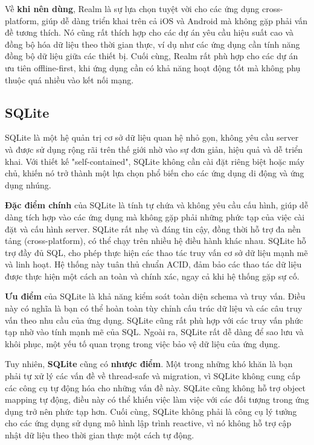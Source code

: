 Về \textbf{khi nên dùng}, Realm là sự lựa chọn tuyệt vời cho các ứng dụng cross-platform, giúp dễ dàng triển khai trên cả iOS và Android mà không gặp phải vấn đề tương thích. Nó cũng rất thích hợp cho các dự án yêu cầu hiệu suất cao và đồng bộ hóa dữ liệu theo thời gian thực, ví dụ như các ứng dụng cần tính năng đồng bộ dữ liệu giữa các thiết bị. Cuối cùng, Realm rất phù hợp cho các dự án ưu tiên offline-first, khi ứng dụng cần có khả năng hoạt động tốt mà không phụ thuộc quá nhiều vào kết nối mạng.

\subsection{SQLite}
SQLite là một hệ quản trị cơ sở dữ liệu quan hệ nhỏ gọn, không yêu cầu server và được sử dụng rộng rãi trên thế giới nhờ vào sự đơn giản, hiệu quả và dễ triển khai. Với thiết kế "self-contained", SQLite không cần cài đặt riêng biệt hoặc máy chủ, khiến nó trở thành một lựa chọn phổ biến cho các ứng dụng di động và ứng dụng nhúng.

\textbf{Đặc điểm chính} của SQLite là tính tự chứa và không yêu cầu cấu hình, giúp dễ dàng tích hợp vào các ứng dụng mà không gặp phải những phức tạp của việc cài đặt và cấu hình server. SQLite rất nhẹ và đáng tin cậy, đồng thời hỗ trợ đa nền tảng (cross-platform), có thể chạy trên nhiều hệ điều hành khác nhau. SQLite hỗ trợ đầy đủ SQL, cho phép thực hiện các thao tác truy vấn cơ sở dữ liệu mạnh mẽ và linh hoạt. Hệ thống này tuân thủ chuẩn ACID, đảm bảo các thao tác dữ liệu được thực hiện một cách an toàn và chính xác, ngay cả khi hệ thống gặp sự cố.

\textbf{Ưu điểm} của SQLite là khả năng kiểm soát toàn diện schema và truy vấn. Điều này có nghĩa là bạn có thể hoàn toàn tùy chỉnh cấu trúc dữ liệu và các câu truy vấn theo nhu cầu của ứng dụng. SQLite cũng rất phù hợp với các truy vấn phức tạp nhờ vào tính mạnh mẽ của SQL. Ngoài ra, SQLite rất dễ dàng để sao lưu và khôi phục, một yếu tố quan trọng trong việc bảo vệ dữ liệu của ứng dụng.

Tuy nhiên, \textbf{SQLite} cũng có \textbf{nhược điểm}. Một trong những khó khăn là bạn phải tự xử lý các vấn đề về thread-safe và migration, vì SQLite không cung cấp các công cụ tự động hóa cho những vấn đề này. SQLite cũng không hỗ trợ object mapping tự động, điều này có thể khiến việc làm việc với các đối tượng trong ứng dụng trở nên phức tạp hơn. Cuối cùng, SQLite không phải là công cụ lý tưởng cho các ứng dụng sử dụng mô hình lập trình reactive, vì nó không hỗ trợ cập nhật dữ liệu theo thời gian thực một cách tự động.

